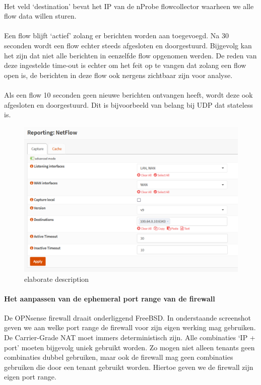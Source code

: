 \paragraph{}
Het veld ‘destination’ bevat het IP van de nProbe flowcollector waarheen we alle flow data willen sturen.

\paragraph{}
Een flow blijft ‘actief’ zolang er berichten worden aan toegevoegd. Na 30 seconden wordt een flow echter steeds afgesloten en doorgestuurd. Bijgevolg kan het zijn dat niet alle berichten in eenzelfde flow opgenomen werden. De reden van deze ingestelde time-out is echter om het feit op te vangen dat zolang een flow open is, de berichten in deze flow ook nergens zichtbaar zijn voor analyse.

\paragraph{}
Als een flow 10 seconden geen nieuwe berichten ontvangen heeft, wordt deze ook afgesloten en doorgestuurd. Dit is bijvoorbeeld van belang bij UDP dat stateless is.

\begin{figure}[!htbp]
    \includegraphics[width=\textwidth]{./graphics/opnsense_netflow_conf.PNG}
    \caption[OPNsense NetFlow configuratie]{elaborate description}
    \label{fig:FirewallNetflow}
\end{figure}

\paragraph{Het aanpassen van de ephemeral port range van de firewall}
De OPNsense firewall draait onderliggend FreeBSD. In onderstaande screenshot geven we aan welke port range de firewall voor zijn eigen werking mag gebruiken. De Carrier-Grade NAT moet immers deterministisch zijn. Alle combinaties ‘IP + port’ moeten bijgevolg uniek gebruikt worden. Zo mogen niet alleen tenants geen combinaties dubbel gebruiken, maar ook de firewall mag geen combinaties gebruiken die door een tenant gebruikt worden. Hiertoe geven we de firewall zijn eigen port range.

